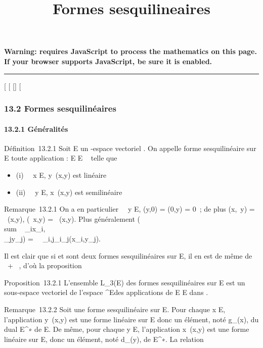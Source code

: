 \documentclass[]{article}
\title{Formes sesquilineaires}
\author{}
\date{}
\begin{document}
\maketitle

\textbf{Warning: 
requires JavaScript to process the mathematics on this page.\\ If your
browser supports JavaScript, be sure it is enabled.}

\begin{center}\rule{3in}{0.4pt}\end{center}

[
[
[]
[

\subsubsection{13.2 Formes sesquilinéaires}

\paragraph{13.2.1 Généralités}

Définition~13.2.1 Soit E un -espace vectoriel . On appelle forme
sesquilinéaire sur E toute application \phi : E \times E \rightarrow~  telle que

\begin{itemize}
\itemsep1pt\parskip0pt
\item
  (i) \forall~~x \in E,
  y\mapsto~\phi(x,y) est linéaire
\item
  (ii) \forall~~y \in E,
  x\mapsto~\phi(x,y) est semilinéaire
\end{itemize}

Remarque~13.2.1 On a en particulier \forall~~y \in E,
\phi(y,0) = \phi(0,y) = 0~; de plus \phi(x,\lambda~y) = \lambda~\phi(x,y), \phi(\lambda~x,y) =
\overline\lambda~\phi(x,y). Plus généralement
\phi(\\sum ~
\lambda_ix_i,\\\sum
 \mu_jy_j) =\
\sum ~
_i,j\overline\lambda_i\mu_j\phi(x_i,y_j).

Il est clair que si \phi et \psi sont deux formes sesquilinéaires sur E, il en
est de même de \alpha~\phi + \beta~\psi, d'où la proposition

Proposition~13.2.1 L'ensemble L_3(E) des formes
sesquilinéaires sur E est un sous-espace vectoriel de l'espace
^E\timesE des applications de E \times E dans .

Remarque~13.2.2 Soit \phi une forme sesquilinéaire sur E. Pour chaque x \in
E, l'application y\mapsto~\phi(x,y) est une forme
linéaire sur E donc un élément, noté g_\phi(x), du dual
E^∗ de E. De même, pour chaque y \in E, l'application
x\mapsto~\overline\phi(x,y) est une
forme linéaire sur E, donc un élément, noté d_\phi(y), de
E^∗. La relation
\end{document}
